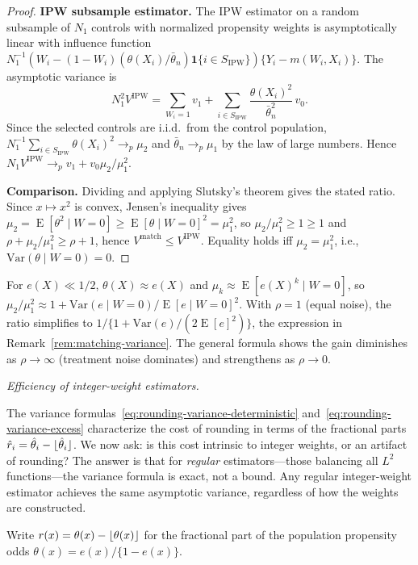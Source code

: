 \documentclass{article}
\newcommand{\paragraph}[1]{\par\noindent\textit{#1}\enspace}
\theoremstyle{definition}
\DeclareMathOperator{\E}{E}
\DeclarePairedDelimiter\floor{\lfloor}{\rfloor}
\newcommand{\<}{\langle}
\renewcommand{\>}{\rangle}
\begin{document}
\begin{refsection}
\begin{proof}
\textbf{IPW subsample estimator.}
The IPW estimator on a random subsample of $N_1$ controls with normalized propensity weights is asymptotically linear with influence function $N_1^{-1}(W_i - (1-W_i)(\theta(X_i)/\bar\theta_n)\mathbf{1}\{i\in S_\mathrm{IPW}\})\{Y_i - m(W_i,X_i)\}$. The asymptotic variance is
\[
N_1^2 V^{\mathrm{IPW}} = \sum_{W_i=1} v_1 + \sum_{i\in S_\mathrm{IPW}}\frac{\theta(X_i)^2}{\bar\theta_n^2}\,v_0.
\]
Since the selected controls are i.i.d.\ from the control population, $N_1^{-1}\sum_{i\in S_\mathrm{IPW}}\theta(X_i)^2 \to_p \mu_2$ and $\bar\theta_n \to_p \mu_1$ by the law of large numbers. Hence $N_1 V^{\mathrm{IPW}} \to_p v_1 + v_0\mu_2/\mu_1^2$.

\textbf{Comparison.}
Dividing and applying Slutsky's theorem gives the stated ratio. Since $x\mapsto x^2$ is convex, Jensen's inequality gives $\mu_2 = \E[\theta^2\mid W=0] \ge \E[\theta\mid W=0]^2 = \mu_1^2$, so $\mu_2/\mu_1^2\ge 1 \ge 1$ and $\rho+\mu_2/\mu_1^2 \ge \rho+1$, hence $V^{\mathrm{match}}\le V^{\mathrm{IPW}}$. Equality holds iff $\mu_2=\mu_1^2$, i.e., $\mathrm{Var}(\theta\mid W=0)=0$.
\end{proof}

For $e(X)\ll 1/2$, $\theta(X)\approx e(X)$ and $\mu_k\approx \E[e(X)^k\mid W=0]$, so $\mu_2/\mu_1^2 \approx 1 + \mathrm{Var}(e\mid W=0)/\E[e\mid W=0]^2$. With $\rho=1$ (equal noise), the ratio simplifies to $1/\{1+\mathrm{Var}(e)/(2\E[e]^2)\}$, the expression in Remark~\ref{rem:matching-variance}. The general formula shows the gain diminishes as $\rho\to\infty$ (treatment noise dominates) and strengthens as $\rho\to 0$.

\paragraph{Efficiency of integer-weight estimators.}

The variance formulas~\eqref{eq:rounding-variance-deterministic} and~\eqref{eq:rounding-variance-excess} characterize the cost of rounding in terms of the fractional parts $\hat r_i = \hat\theta_i - \floor{\hat\theta_i}$. We now ask: is this cost intrinsic to integer weights, or an artifact of rounding? The answer is that for \emph{regular} estimators---those balancing all $L^2$ functions---the variance formula is exact, not a bound. Any regular integer-weight estimator achieves the same asymptotic variance, regardless of how the weights are constructed.

Write $r(x) = \theta(x) - \floor{\theta(x)}$ for the fractional part of the population propensity odds $\theta(x) = e(x)/\{1-e(x)\}$.


\end{refsection}
\end{document}
